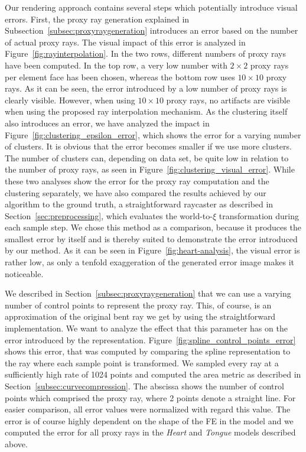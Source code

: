 \documentclass[journal]{vgtc}                %
\begin{document}
Our rendering approach contains several steps which potentially introduce visual errors. First, the proxy ray generation explained in Subsection~\ref{subsec:proxyraygeneration} introduces an error based on the number of actual proxy rays. The visual impact of this error is analyzed in Figure~\ref{fig:rayinterpolation}. In the two rows, different numbers of proxy rays have been computed. In the top row, a very low number with $2 \times 2$ proxy rays per element face has been chosen, whereas the bottom row uses $10 \times 10$ proxy rays. As it can be seen, the error introduced by a low number of proxy rays is clearly visible. However, when using $10 \times 10$ proxy rays, no artifacts are visible when using the proposed ray interpolation mechanism. As the clustering itself also introduces an error, we have analyzed the impact in Figure~\ref{fig:clustering_epsilon_error}, which shows the error for a varying number of clusters. It is obvious that the error becomes smaller if we use more clusters. The number of clusters can, depending on data set, be quite low in relation to the number of proxy rays, as seen in Figure~\ref{fig:clustering_visual_error}. While these two analyses show the error for the proxy ray computation and the clustering separately, we have also compared the results achieved by our algorithm to the ground truth, a straightforward raycaster as described in Section~\ref{sec:preprocessing}, which evaluates the world-to-$\xi$ transformation during each sample step. We chose this method as a comparison, because it produces the smallest error by itself and is thereby suited to demonstrate the error introduced by our method. As it can be seen in Figure~\ref{fig:heart-analysis}, the visual error is rather low, as only a tenfold exaggeration of the generated error image makes it noticeable.

We described in Section~\ref{subsec:proxyraygeneration} that we can use a varying number of control points to represent the proxy ray. This, of course, is an approximation of the original bent ray we get by using the straightforward implementation. We want to analyze the effect that this parameter has on the error introduced by the representation. Figure~\ref{fig:spline_control_points_error} shows this error, that was computed by comparing the spline representation to the ray where each sample point is transformed. We sampled every ray at a sufficiently high rate of 1024 points and computed the area metric as described in Section~\ref{subsec:curvecompression}. The abscissa shows the number of control points which comprised the proxy ray, where 2 points denote a straight line. For easier comparison, all error values were normalized with regard this value. The error is of course highly dependent on the shape of the FE in the model and we computed the error for all proxy rays in the \emph{Heart} and \emph{Tongue} models described above.
\end{document}

